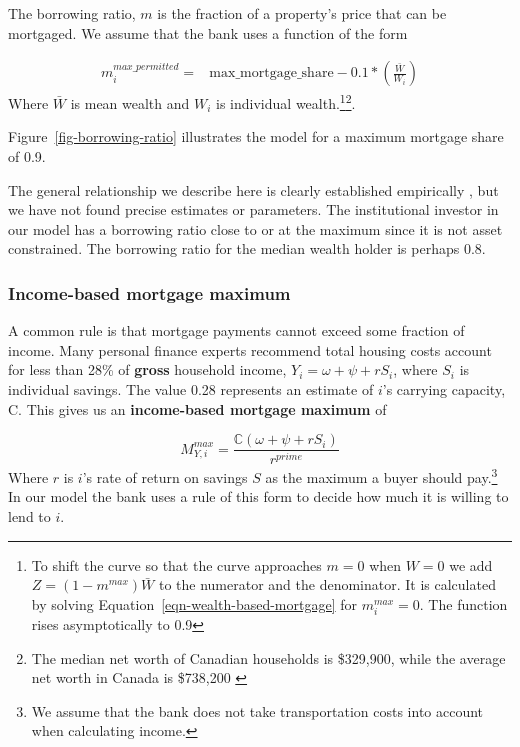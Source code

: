 {The borrowing ratio, $m$ is the fraction of a property's price that can be mortgaged. We assume that the bank uses a function of the form 


\begin{align}
m_i^{max\_permitted} =& \mathrm{max\_mortgage\_share} - 0.1*\left(\frac{\bar W}{ W_i}\right) \label{eqn-wealth-based-mortgage}  %
\end{align} 
Where $\bar{W}$ is mean wealth and $W_i$ is individual wealth.\footnote{To shift the curve  so that the curve approaches $m=0$ when $W=0$ we add  $Z=(1-m^{max})\bar W$ to the numerator and the denominator. It is calculated by solving Equation~\ref{eqn-wealth-based-mortgage} for {$m_i^{max}=0$. } 
The function rises asymptotically to 0.9}\footnote{ The median net worth of Canadian households is \$329,900, while the average net worth in Canada is \$738,200 \cite{WEB-model-stats-can-median-net-worth}}.

Figure~\ref{fig-borrowing-ratio} illustrates the model for a maximum mortgage  share of 0.9.

The general relationship we describe here is clearly established empirically \cite{}, but we have not found precise  estimates or parameters. The institutional investor in our model has a borrowing ratio close to or at the maximum since it is not asset constrained. The borrowing ratio for the median wealth holder is perhaps 0.8.


\subsubsection{Income-based mortgage maximum}
A common rule is that mortgage payments cannot exceed some fraction of income. 
Many personal finance experts recommend total housing costs account for less than 28\% of \textbf{gross} household income, $Y_i=\omega+ \psi + {r}S_i$, where $S_i$ is individual savings. The value 0.28 represents an estimate of $i$'s carrying capacity, $\mathrm{C}$. This gives us an \textbf{income-based  mortgage maximum} of 


\begin{equation}
M^{max}_{Y,i} = \frac{\mathbb{C} (\omega+ \psi + {r}S_i)}{r^{prime}}\label{eqn-income-based-mortgage}    
\end{equation}
Where ${r}$ is $i$'s rate of return on savings $S$ as the maximum a  buyer should pay.\footnote{We  assume that the bank does not take transportation costs into account  when calculating income.}
In our model the bank uses a rule of this form to decide how much it is willing to lend to $i$.

}

